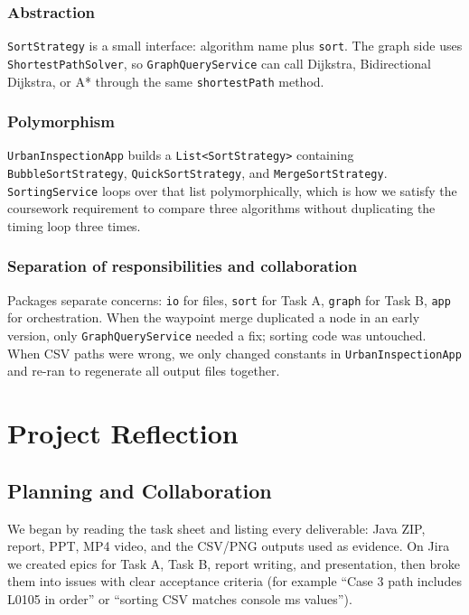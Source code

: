 \documentclass[12pt,a4paper,twocolumn,openany]{report}
\newcommand{\p}[1]{\path{#1}}
\begin{document}
\subsection{Abstraction}
\texttt{SortStrategy} is a small interface: algorithm name plus \texttt{sort}. 
The graph side uses \texttt{ShortestPathSolver}, so \texttt{GraphQueryService} can call Dijkstra, Bidirectional Dijkstra, or A* through the same \texttt{shortestPath} method.

\subsection{Polymorphism}
\texttt{UrbanInspectionApp} builds a \texttt{List<SortStrategy>} containing \texttt{BubbleSortStrategy}, \texttt{QuickSortStrategy}, and \texttt{MergeSortStrategy}. 
\texttt{SortingService} loops over that list polymorphically, which is how we satisfy the coursework requirement to compare three algorithms without duplicating the timing loop three times.

\subsection{Separation of responsibilities and collaboration}
Packages separate concerns: \texttt{io} for files, \texttt{sort} for Task A, \texttt{graph} for Task B, \texttt{app} for orchestration. 
When the waypoint merge duplicated a node in an early version, only \texttt{GraphQueryService} needed a fix; sorting code was untouched. 
When CSV paths were wrong, we only changed constants in \texttt{UrbanInspectionApp} and re-ran \p{UrbanInspectionApp.main} to regenerate all output files together.

\chapter{Project Reflection}

\section{Planning and Collaboration}
We began by reading the task sheet and listing every deliverable: Java ZIP, report, PPT, MP4 video, and the CSV/PNG outputs used as evidence. 
On Jira we created epics for Task A, Task B, report writing, and presentation, then broke them into issues with clear acceptance criteria (for example ``Case 3 path includes L0105 in order'' or ``sorting CSV matches console ms values'').
\end{document}
